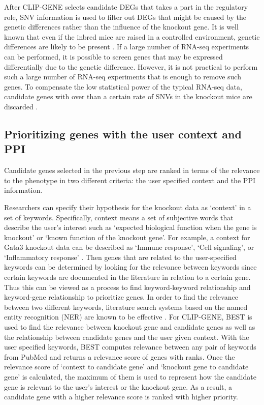\documentclass[oneside,phd]{snuthesis}
\begin{document}
After CLIP-GENE selects candidate DEGs that takes a part in the regulatory role, SNV information is used to filter out DEGs that might be caused by the genetic differences rather than the influence of the knockout gene.
It is well known that even if the inbred mice are raised in a controlled environment, genetic differences are likely to be present \citep{EISENERDORMAN2009318}. 
If a large number of RNA-seq experiments can be performed, it is possible to screen genes that may be expressed differentially due to the genetic difference. However, it is not practical to perform such a large number of RNA-seq experiments that is enough to remove such genes. 
To compensate the low statistical power of the typical RNA-seq data, candidate genes with over than a certain rate of SNVs in the knockout mice are
discarded \citep{hur2015combined}.

\subsection{Prioritizing genes with the user context and PPI}
Candidate genes selected in the previous step are ranked in terms of the relevance to the phenotype in two different criteria: the user specified context and the PPI information.

Researchers can specify their hypothesis for the knockout data as ‘context’ in a set of keywords. 
Specifically, context means a set of subjective words that describe the user’s
interest such as ‘expected biological function when the gene is knockout’ or ‘known function of the knockout gene’. 
For example, a context for Gata3 knockout data can be described as ‘Immune response’, ‘Cell signaling’, or ‘Inflammatory response’ \citep{yagi2014transcription,WAN2014233}. 
Then genes that are related to the user-specified keywords can be determined
by looking for the relevance between keywords since certain
keywords are documented in the literature in relation
to a certain gene. 
Thus this can be viewed as a process to find keyword-keyword relationship and keyword-gene relationship to prioritize genes.
In order to find the relevance between two different keywords, literature search systems based on the named entity recognition (NER) are known to be effective \citep{10.1093/bib/bbr018}.
For CLIP-GENE, BEST \citep{lee2016best} is used to find the relevance between knockout gene and candidate genes as well as the relationship between candidate genes and the user given context. 
With the user specified keywords, BEST computes relevance between any pair of keywords from PubMed and returns a relevance score of genes with ranks.
Once the relevance score of ‘context to candidate gene’ and ‘knockout gene to candidate gene’ is calculated, the maximum of them is used to represent how the candidate gene is relevant to the user’s interest or the knockout gene.
As a result, a candidate gene with a higher relevance score is ranked with higher priority.
\end{document}
